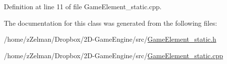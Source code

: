 Definition at line 11 of file Game\-Element\-\_\-static.\-cpp.



The documentation for this class was generated from the following files\-:\begin{DoxyCompactItemize}
\item 
/home/z\-Zelman/\-Dropbox/2\-D-\/\-Game\-Engine/src/\hyperlink{GameElement__static_8h}{Game\-Element\-\_\-static.\-h}\item 
/home/z\-Zelman/\-Dropbox/2\-D-\/\-Game\-Engine/src/\hyperlink{GameElement__static_8cpp}{Game\-Element\-\_\-static.\-cpp}\end{DoxyCompactItemize}

